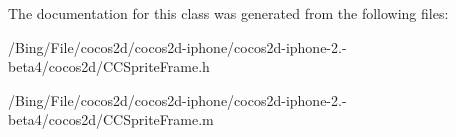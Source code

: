 The documentation for this class was generated from the following files\-:\begin{DoxyCompactItemize}
\item 
/\-Bing/\-File/cocos2d/cocos2d-\/iphone/cocos2d-\/iphone-\/2.-\/beta4/cocos2d/C\-C\-Sprite\-Frame.\-h\item 
/\-Bing/\-File/cocos2d/cocos2d-\/iphone/cocos2d-\/iphone-\/2.-\/beta4/cocos2d/C\-C\-Sprite\-Frame.\-m\end{DoxyCompactItemize}
